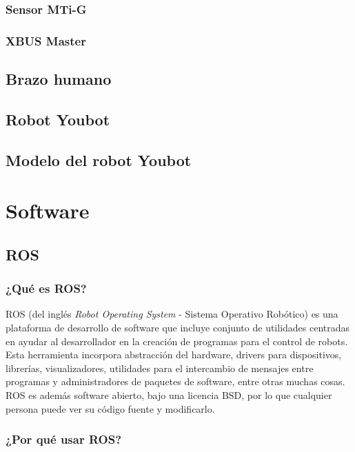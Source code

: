 \documentclass[10pt, a4paper]{report}
\begin{document}
\subsubsection{Sensor MTi-G}

\subsubsection{XBUS Master}

\subsection{Brazo humano}

\subsection{Robot Youbot}

\subsection{Modelo del robot Youbot}

\section{Software}

\subsection{ROS}

\subsubsection{¿Qué es ROS?}

ROS (del inglés \textit{Robot Operating System} - Sistema Operativo Robótico) es una plataforma de desarrollo de software que incluye conjunto de utilidades centradas en ayudar al desarrollador en la creación de programas para el control de robots. Esta herramienta incorpora abstracción del hardware, drivers para dispositivos, librerías, visualizadores, utilidades para el intercambio de mensajes entre programas y administradores de paquetes de software, entre otras muchas cosas. ROS es además software abierto, bajo una licencia BSD, por lo que cualquier persona puede ver su código fuente y modificarlo.

\subsubsection{¿Por qué usar ROS?}
\end{document}
